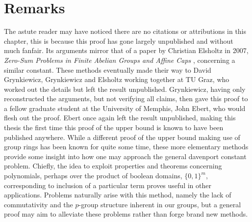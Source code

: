 \section{Remarks}
The astute reader may have noticed there are no citations or attributions in this chapter, this is because this proof has gone largely unpublished and without much fanfair. Its arguments mirror that of a paper by Christian Elsholtz in 2007, \textit{Zero-Sum Problems in Finite Abelian Groups and Affine Caps} \cite{Elsholtz_2007}, concerning a similar constant. These methods eventually made their way to David Grynkiewicz, Grynkiewicz and Elsholtz working together at TU Graz, who worked out the details but left the result unpublished. Grynkiewicz, having only reconstructed the arguments, but not verifying all claims, then gave this proof to a fellow graduate student at the University of Memphis, John Ebert, who would flesh out the proof. Ebert once again left the result unpublished, making this thesis the first  time this proof of the upper bound is known to have been published anywhere. While a different proof of the upper bound making use of group rings has been known for quite some time, these more elementary methods provide some insight into how one may approach the general davenport constant problem. Chiefly, the idea to exploit properties and theorems concerning polynomials, perhaps over the product of boolean domains, \(\{0, 1\} ^{m}\), corresponding to inclusion of a particular term proves useful in other applications. Problems naturally arise with this method, namely the lack of commutativity and the \(p\)-group structure inherent in our groups, but a general proof may aim to alleviate these problems rather than forge brand new methods.
